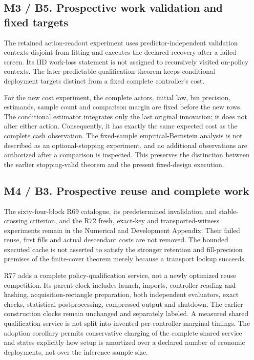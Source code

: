 \hypertarget{m3-b5.-prospective-work-validation-and-fixed-targets}{%
\subsection{M3 / B5. Prospective work validation and fixed
targets}\label{m3-b5.-prospective-work-validation-and-fixed-targets}}

The retained action-readout experiment uses predictor-independent
validation contexts disjoint from fitting and executes the declared
recovery after a failed screen. Its IID work-loss statement is not
assigned to recursively visited on-policy contexts. The later
predictable qualification theorem keeps conditional deployment targets
distinct from a fixed complete controller's cost.

For the new cost experiment, the complete actors, initial law, bin
precision, estimands, sample count and comparison margin are fixed
before the new rows. The conditional estimator integrates only the last
original innovation; it does not alter either action. Consequently, it
has exactly the same expected cost as the complete cash observation. The
fixed-sample empirical-Bernstein analysis is not described as an
optional-stopping experiment, and no additional observations are
authorized after a comparison is inspected. This preserves the
distinction between the earlier stopping-valid theorem and the present
fixed-design execution.

\hypertarget{m4-b3.-prospective-reuse-and-complete-work}{%
\subsection{M4 / B3. Prospective reuse and complete
work}\label{m4-b3.-prospective-reuse-and-complete-work}}

The sixty-four-block R69 catalogue, its predetermined invalidation and
stable-crossing criterion, and the R72 fresh, exact-key and
transported-witness experiments remain in the Numerical and Development
Appendix. Their failed reuse, first fills and actual descendant costs
are not removed. The bounded executed cache is not asserted to satisfy
the stronger retention and fill-precision premises of the finite-cover
theorem merely because a transport lookup succeeds.

R77 adds a complete policy-qualification service, not a newly optimized
reuse competition. Its parent clock includes launch, imports, controller
reading and hashing, acquisition-rectangle preparation, both independent
evaluators, exact checks, statistical postprocessing, compressed output
and shutdown. The earlier construction clocks remain unchanged and
separately labeled. A measured shared qualification service is not split
into invented per-controller marginal timings. The adoption corollary
permits conservative charging of the complete shared service and states
explicitly how setup is amortized over a declared number of economic
deployments, not over the inference sample size.


